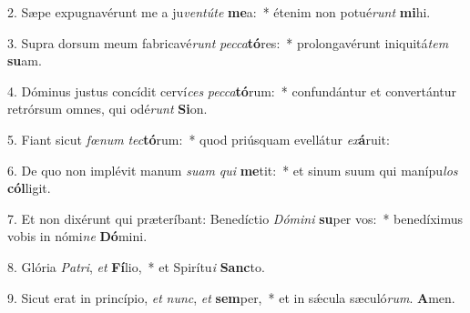 2. Sæpe expugnavérunt me a ju\textit{ven}\textit{tú}\textit{te} \textbf{me}a:~*  étenim non potué\textit{runt} \textbf{mi}hi.\

3. Supra dorsum meum fabricavé\textit{runt} \textit{pec}\textit{ca}\textbf{tó}res:~*  prolongavérunt iniquitá\textit{tem} \textbf{su}am.\

4. Dóminus justus concídit cerví\textit{ces} \textit{pec}\textit{ca}\textbf{tó}rum:~*  confundántur et convertántur retrórsum omnes, qui odé\textit{runt} \textbf{Si}on.\

5. Fiant sicut \textit{fœ}\textit{num} \textit{tec}\textbf{tó}rum:~*  quod priúsquam evellátur \textit{ex}\textbf{á}ruit:\

6. De quo non implévit manum \textit{su}\textit{am} \textit{qui} \textbf{me}tit:~*  et sinum suum qui manípu\textit{los} \textbf{cól}ligit.\

7. Et non dixérunt qui præteríbant: Benedíctio \textit{Dó}\textit{mi}\textit{ni} \textbf{su}per vos:~*  benedíximus vobis in nómi\textit{ne} \textbf{Dó}mini.\

8. Glória \textit{Pa}\textit{tri}, \textit{et} \textbf{Fí}lio,~*  et Spirítu\textit{i} \textbf{Sanc}to.\

9. Sicut erat in princípio, \textit{et} \textit{nunc}, \textit{et} \textbf{sem}per,~*  et in sǽcula sæculó\textit{rum}. \textbf{A}men.\

